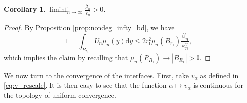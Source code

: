 \documentclass[10pt,a4paper]{article}
\newtheorem{cor}[thm]{Corollary}
\numberwithin{equation}{section}
\begin{document}
\begin{cor}
	\label{cor:nondeg_inf_bound}
	$ \liminf_{n \rightarrow \infty} \frac{\beta_n}{\varepsilon_n^{\gamma}} > 0$.
\end{cor}
\begin{proof}
	By Proposition \ref{prop:nondeg_infty_bd}, we have 
	\[
		1 = \int_{B_{r_1}} U_n \mu_n(y)\mathrm{d}y \leq 2r_1^{2} \mu_n(B_{r_1})  \frac{\beta_n}{\varepsilon_n^{\gamma}},
	\]
which implies the claim by recalling that $\mu_n(B_{R_1}) \rightarrow |B_{R_1}| > 0$.
\end{proof}

We now turn to the convergence of the interfaces. First, take $ v_{\alpha} $ as defined in \eqref{eq:v_rescale}. It is then easy to see that the function $ \alpha \mapsto v_{\alpha} $ is continuous for the topology of uniform convergence.
\end{document}
